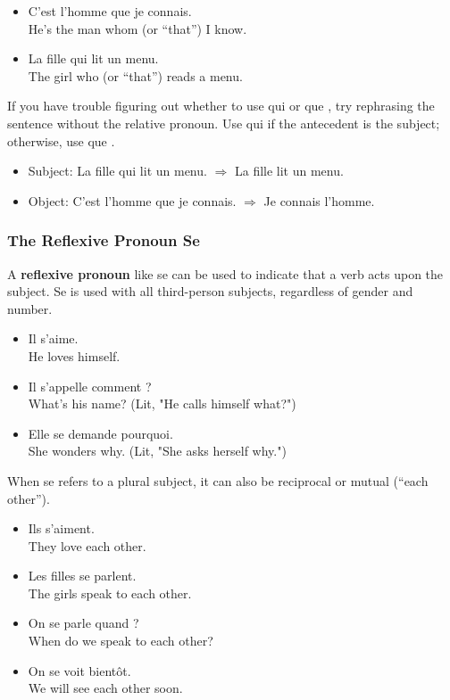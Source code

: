\begin{itemize}
  \item  C'est l'homme que je connais. \\ He's the man whom (or ``that'') I know.
  \item  La fille qui lit un menu. \\ The girl who (or ``that'') reads a menu.
\end{itemize}

If you have trouble figuring out whether to use \guillemotleft qui \guillemotright or \guillemotleft que \guillemotright , try rephrasing the sentence without the relative pronoun. Use \guillemotleft qui \guillemotright if the antecedent is the subject; otherwise, use \guillemotleft que \guillemotright .

\begin{itemize}
  \item  Subject: La fille qui lit un menu. $\Rightarrow$ La fille lit un menu.
  \item  Object: C'est l'homme que je connais. $\Rightarrow$ Je connais l'homme.
\end{itemize}

\subsubsection{The Reflexive Pronoun Se}

A \textbf{reflexive pronoun} like \guillemotleft se \guillemotright can be used to indicate that a verb acts upon the subject. \guillemotleft Se \guillemotright is used with all third-person subjects, regardless of gender and number.

\begin{itemize}
  \item  Il s'aime. \\ He loves himself.
  \item  Il s'appelle comment ? \\ What's his name? (Lit, "He calls himself what?")
  \item  Elle se demande pourquoi. \\ She wonders why. (Lit, "She asks herself why.")
\end{itemize}

When \guillemotleft se \guillemotright refers to a plural subject, it can also be reciprocal or mutual (``each other'').

\begin{itemize}
  \item  Ils s'aiment. \\ They love each other.
  \item  Les filles se parlent. \\ The girls speak to each other.
  \item  On se parle quand ? \\ When do we speak to each other?
  \item  On se voit bient{\^o}t. \\ We will see each other soon.
\end{itemize}


